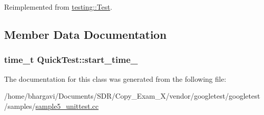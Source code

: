 Reimplemented from \hyperlink{classtesting_1_1_test_a5f0ab439802cbe0ef7552f1a9f791923}{testing\+::\+Test}.



\subsection{Member Data Documentation}
\subsubsection[{\texorpdfstring{start\+\_\+time\+\_\+}{start_time_}}]{\setlength{\rightskip}{0pt plus 5cm}time\+\_\+t Quick\+Test\+::start\+\_\+time\+\_\+\hspace{0.3cm}{\ttfamily [protected]}}\hypertarget{class_quick_test_aba6a28bbd733e72e3b088a0b66386809}{}\label{class_quick_test_aba6a28bbd733e72e3b088a0b66386809}


The documentation for this class was generated from the following file\+:\begin{DoxyCompactItemize}
\item 
/home/bhargavi/\+Documents/\+S\+D\+R/\+Copy\+\_\+\+Exam\+\_\+X/vendor/googletest/googletest/samples/\hyperlink{sample5__unittest_8cc}{sample5\+\_\+unittest.\+cc}\end{DoxyCompactItemize}
